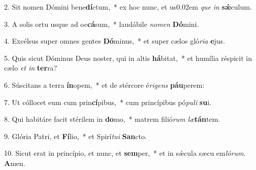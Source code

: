 \item 2. Sit nomen Dómini bene\textbf{dí}ctum,~* ex hoc nunc, et us\kern 0.02em \textit{que} \textit{in} \textbf{sǽ}culum.
\item 3. A solis ortu usque ad oc\textbf{cá}sum,~* laudábile \textit{nomen} \textbf{Dó}mini.
\item 4. Excélsus super omnes gentes \textbf{Dó}minus,~* et super cælos gló\textit{ria} \textbf{e}jus.
\item 5. Quis sicut Dóminus Deus noster, qui in altis \textbf{há}bitat,~* et humília réspicit in cælo \textit{et in} \textbf{ter}ra?
\item 6. Súscitans a terra \textbf{ín}opem,~* et de stércore é\textit{rigens} \textbf{páu}perem:
\item 7. Ut cóllocet eum cum prin\textbf{cí}pibus,~* cum princípibus pó\textit{puli} \textbf{su}i.
\item 8. Qui habitáre facit stérilem in \textbf{do}mo,~* matrem filió\textit{rum} \textit{læ}\textbf{tán}tem.
\item 9. Glória Patri, et \textbf{Fí}lio,~* et Spirí\textit{tui} \textbf{San}cto.
\item 10. Sicut erat in princípio, et nunc, et \textbf{sem}per,~* et in sǽcula sæcu em\textit{lórum}. \textbf{A}men.
